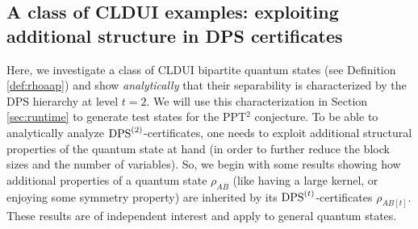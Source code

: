 \documentclass[11pt]{article}
\newcommand{\N}{\ensuremath{\mathbb{N}}}   %
\newcommand{\DPS}{\text{\rm DPS}}
\theoremstyle{plain}
\begin{document}

\subsection{A class of CLDUI examples: exploiting additional structure in DPS certificates}

Here, we investigate a class of CLDUI bipartite quantum states (see Definition \ref{def:rhoaap}) and show {\em analytically} that   their separability is characterized by the DPS hierarchy at level $t=2$. We will use this characterization in Section \ref{sec:runtime} %
 to generate test states for the PPT$^2$ conjecture. To be able to analytically analyze $\DPS^{(2)}$-certificates, one needs to exploit additional structural properties of the quantum state at hand (in order to  further reduce the block sizes and the number of variables). 
So, we begin with 
some results showing how additional properties of a quantum state $\rho_{AB}$ (like having a large kernel, or enjoying some symmetry property) are inherited by its $\DPS^{(t)}$-certificates $\rho_{AB[t]}$. These results are of independent interest and apply to general quantum states.%
\end{document}
